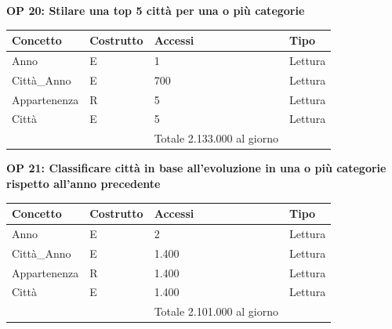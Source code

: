 \documentclass[a4paper,12pt]{report}
\begin{document}
            \textbf{OP 20: Stilare una top 5 città per una o più categorie}
        	\begin{table}[H]
            \centering
             \begin{tabular}{||l l l l||}
             \hline
             Concetto & Costrutto & Accessi & Tipo \\ [0.5ex] 
             \hline\hline
             Anno & E & 1 & Lettura \\ 
             Città\_Anno & E & 700 & Lettura \\ 
             Appartenenza & R & 5 & Lettura \\ 
             Città & E & 5 & Lettura \\ 
             \hline
                &   & Totale  2.133.000 al giorno &  \\ [1ex] 
             \hline
             \end{tabular}
            \end{table}

            \textbf{OP 21: Classificare città in base all’evoluzione in una o più categorie rispetto all’anno precedente}
        	\begin{table}[H]
            \centering
             \begin{tabular}{||l l l l||}
             \hline
             Concetto & Costrutto & Accessi & Tipo \\ [0.5ex] 
             \hline\hline
             Anno & E & 2 & Lettura \\ 
             Città\_Anno & E & 1.400 & Lettura \\ 
             Appartenenza & R & 1.400 & Lettura \\ 
             Città & E & 1.400 & Lettura \\ 
             \hline
                &   & Totale  2.101.000 al giorno &  \\ [1ex] 
             \hline
             \end{tabular}
            \end{table}
\end{document}
